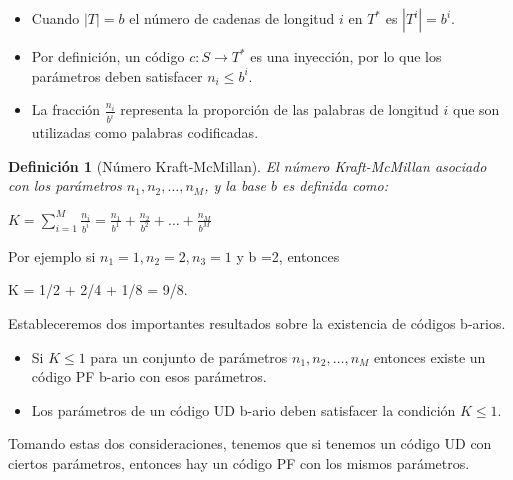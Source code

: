 \documentclass{beamer}
\newtheorem{definicion} [Definicion]{Definición}
\begin{document}
\begin{frame}      \small

\begin{itemize}

\item Cuando $|T| = b$ el número de cadenas de longitud $i$ en $T^{*}$ es $|T^{i}| = b^{i}$. 

\item Por definición, un código $c: S\rightarrow T^{*}$ es una inyección, por lo que los parámetros deben satisfacer $n_{i} \leq b^{i}$. 

\item La fracción  $\frac{n_{i}}{b^{i}}$ representa la proporción de las palabras de longitud $i$ que son utilizadas como palabras codificadas.

\end{itemize}
 
 \begin{definicion} [Número Kraft-McMillan]\label{KMnumber}
El número Kraft-McMillan asociado con los parámetros $n_{1}, n_{2},\ldots,n_{M}$, y la base $b$ es definida como:
\begin{center}
$K=  \sum_{i=1}^{M} \frac{n_{i}}{b^{i}}    =  \frac{n_{1}}{b^{1}}   +  \frac{n_{2}}{b^{2}}   + \ldots + \frac{n_{M}}{b^{M}}  $
\end{center}


\end{definicion}

Por ejemplo si $n_{1}=1, n_{2}=2, n_{3}=1$ y b =2, entonces\\

\begin{center}
  K = 1/2 + 2/4 + 1/8 = 9/8.
\end{center}


\end{frame}



\begin{frame}      \small
 
 Estableceremos dos importantes resultados sobre la existencia de códigos b-arios.

\begin{itemize}
\item Si $K \leq 1$ para un conjunto de parámetros $n_{1}, n_{2}, \ldots, n_{M}$ entonces existe un código PF b-ario con esos parámetros.
\item Los parámetros de un código UD b-ario deben satisfacer la condición $K \leq 1$.
\end{itemize}

Tomando estas dos consideraciones, tenemos que si tenemos un código UD con ciertos parámetros, entonces hay un código PF con los mismos parámetros.

\end{frame}
\end{document}
